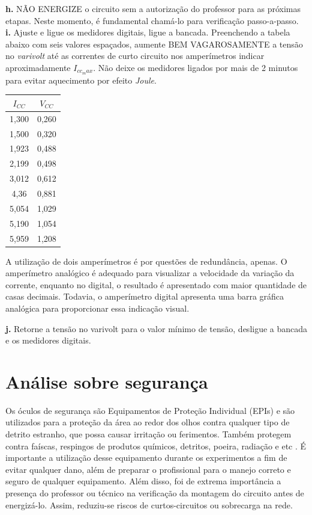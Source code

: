 \documentclass[a4paper,12pt,oneside,openany,table,xcdraw]{article}
\begin{document}
\noindent\textbf{h.} NÃO ENERGIZE o circuito sem a autorização do professor para as próximas etapas. Neste momento, é fundamental chamá-lo para verificação passo-a-passo. \\
\textbf{i.} Ajuste e ligue os medidores digitais, ligue a bancada. Preenchendo a tabela abaixo com seis valores espaçados, aumente BEM VAGAROSAMENTE a tensão no \textit{varivolt} até as correntes de curto circuito nos amperímetros indicar aproximadamente $I_{cc_max}$. Não deixe os medidores ligados por mais de 2 minutos para evitar aquecimento por efeito \textit{Joule}.  \\

\begin{table}[H]
\centering
\def\arraystretch{1.35}
\captionsetup{font=scriptsize}
 \label{tab2}
\begin{tabular}{|c|c|}
\hline
$I_{CC}$ & $V_{CC}$ \\ \hline
1,300    & 0,260    \\ \hline
1,500    & 0,320    \\ \hline
1,923    & 0,488    \\ \hline
2,199    & 0,498    \\ \hline
3,012    & 0,612    \\ \hline
4,36     & 0,881    \\ \hline
5,054    & 1,029    \\ \hline
5,190    & 1,054    \\ \hline
5,959    & 1,208    \\ \hline
\end{tabular}
\end{table}

A utilização de dois amperímetros é por questões de redundância, apenas. O amperímetro analógico é adequado para visualizar a velocidade da variação da corrente, enquanto no digital, o resultado é apresentado com maior quantidade de casas decimais. Todavia, o amperímetro digital apresenta uma barra gráfica analógica para proporcionar essa indicação visual. 

\noindent\textbf{j.} Retorne a tensão no varivolt para o valor mínimo de tensão, desligue a bancada e os medidores digitais.\\

\section{Análise sobre segurança} %
Os óculos de segurança são Equipamentos de Proteção Individual (EPIs) e são utilizados para a proteção da área ao redor dos olhos contra qualquer tipo de detrito estranho, que possa causar irritação ou ferimentos. Também protegem contra faíscas, respingos de produtos químicos, detritos, poeira, radiação e etc \cite{safe}.
É importante a utilização desse equipamento durante os experimentos a fim de evitar qualquer dano, além de preparar o profissional para o manejo correto e seguro de qualquer equipamento.
Além disso, foi de extrema importância a presença do professor ou técnico na verificação da montagem do circuito antes de energizá-lo. Assim, reduziu-se riscos de curtos-circuitos ou sobrecarga na rede.
\end{document}
